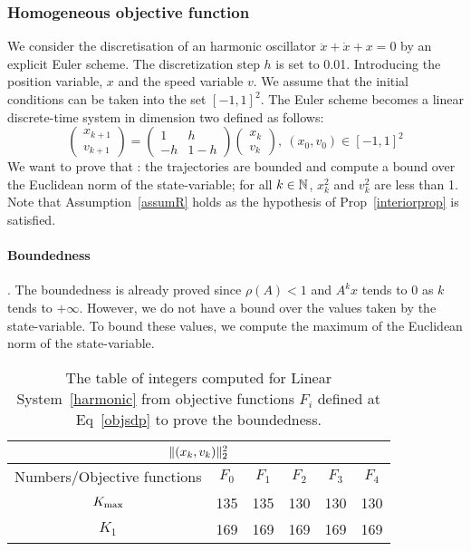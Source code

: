 \documentclass[10pt]{llncs}
\begin{document}
\subsubsection{Homogeneous objective function}
\label{exp-linear}
We consider the discretisation of an harmonic oscillator $\ddot{x}+\dot{x}+x=0$ by an explicit Euler scheme. The discretization step $h$ is set to 0.01. Introducing the position variable, $x$ and the speed variable $v$. We assume that the initial conditions can be taken into the set $[-1,1]^2$. The Euler scheme becomes a linear discrete-time system in dimension two defined as follows: 
\begin{equation}
\label{harmonic}
\begin{pmatrix}
x_{k+1}\\
v_{k+1}
\end{pmatrix}
=\begin{pmatrix}
1 & h\\
-h & 1-h
\end{pmatrix}
\begin{pmatrix}
x_{k}\\
v_{k}
\end{pmatrix},\ (x_0,v_0)\in [-1,1]^2
\end{equation}
We want to prove that :
the trajectories are bounded and compute a bound over the Euclidean norm of the state-variable; for all $k\in\mathbb{N}$, $x_{k}^2$ and $v_{k}^2$ are less than 1.
Note that Assumption~\ref{assumR} holds as the hypothesis of Prop~\ref{interiorprop} is satisfied.
\paragraph{Boundedness}. The boundedness is already proved since $\rho(A)<1$ and $A^k x$ tends to 0 as $k$ tends to $+\infty$. However, we do not have a bound over the values taken by the state-variable. To bound these values, we compute the maximum of the Euclidean norm of the state-variable.  

\vspace{-0.4cm}

\begin{table}[H]
\begin{center}
\begin{tabular}{|c|c|c|c|c|c|}
\hline
\multicolumn{6}{|c|}{$\| (x_k,v_k)\|_2^2$}\\
\hline
Numbers/Objective functions & $F_0$ & $F_{1}$ & $F_{2}$ & $F_3$ & $F_4$ \\
\hline
$K_{\rm max}$ &135 &135 &130 &130 &130 \\
\hline
 $K_{1}$ & 169& 169&169 &169 & 169\\
\hline
\end{tabular}
\end{center}
\caption{The table of integers computed for Linear System~\eqref{harmonic} from objective functions $F_i$ defined at Eq~\eqref{objsdp} to prove the boundedness.}
\end{table}
\end{document}
